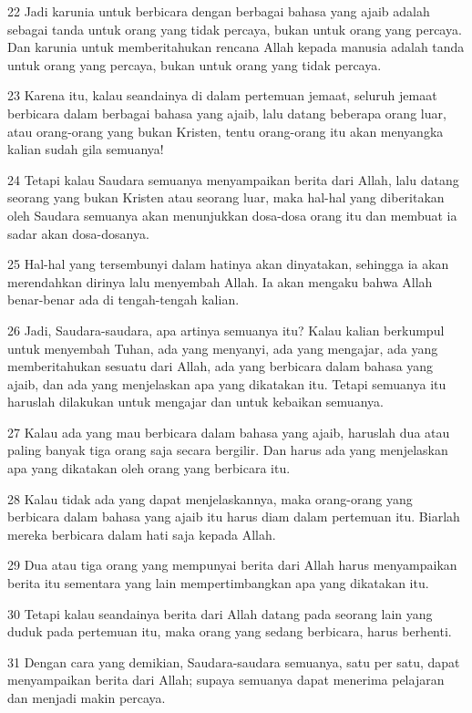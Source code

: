 \par 22 Jadi karunia untuk berbicara dengan berbagai bahasa yang ajaib adalah sebagai tanda untuk orang yang tidak percaya, bukan untuk orang yang percaya. Dan karunia untuk memberitahukan rencana Allah kepada manusia adalah tanda untuk orang yang percaya, bukan untuk orang yang tidak percaya.
\par 23 Karena itu, kalau seandainya di dalam pertemuan jemaat, seluruh jemaat berbicara dalam berbagai bahasa yang ajaib, lalu datang beberapa orang luar, atau orang-orang yang bukan Kristen, tentu orang-orang itu akan menyangka kalian sudah gila semuanya!
\par 24 Tetapi kalau Saudara semuanya menyampaikan berita dari Allah, lalu datang seorang yang bukan Kristen atau seorang luar, maka hal-hal yang diberitakan oleh Saudara semuanya akan menunjukkan dosa-dosa orang itu dan membuat ia sadar akan dosa-dosanya.
\par 25 Hal-hal yang tersembunyi dalam hatinya akan dinyatakan, sehingga ia akan merendahkan dirinya lalu menyembah Allah. Ia akan mengaku bahwa Allah benar-benar ada di tengah-tengah kalian.
\par 26 Jadi, Saudara-saudara, apa artinya semuanya itu? Kalau kalian berkumpul untuk menyembah Tuhan, ada yang menyanyi, ada yang mengajar, ada yang memberitahukan sesuatu dari Allah, ada yang berbicara dalam bahasa yang ajaib, dan ada yang menjelaskan apa yang dikatakan itu. Tetapi semuanya itu haruslah dilakukan untuk mengajar dan untuk kebaikan semuanya.
\par 27 Kalau ada yang mau berbicara dalam bahasa yang ajaib, haruslah dua atau paling banyak tiga orang saja secara bergilir. Dan harus ada yang menjelaskan apa yang dikatakan oleh orang yang berbicara itu.
\par 28 Kalau tidak ada yang dapat menjelaskannya, maka orang-orang yang berbicara dalam bahasa yang ajaib itu harus diam dalam pertemuan itu. Biarlah mereka berbicara dalam hati saja kepada Allah.
\par 29 Dua atau tiga orang yang mempunyai berita dari Allah harus menyampaikan berita itu sementara yang lain mempertimbangkan apa yang dikatakan itu.
\par 30 Tetapi kalau seandainya berita dari Allah datang pada seorang lain yang duduk pada pertemuan itu, maka orang yang sedang berbicara, harus berhenti.
\par 31 Dengan cara yang demikian, Saudara-saudara semuanya, satu per satu, dapat menyampaikan berita dari Allah; supaya semuanya dapat menerima pelajaran dan menjadi makin percaya.
